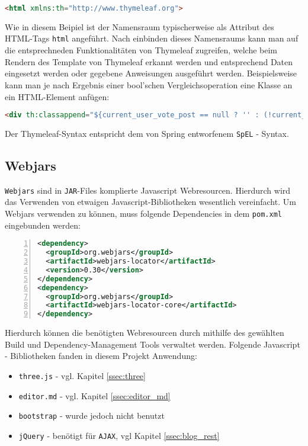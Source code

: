 \documentclass[paper=a4,12pt]{scrreprt}
\begin{document}
\begin{lstlisting}[language=html]
  <html xmlns:th="http://www.thymeleaf.org">
\end{lstlisting}

Wie in diesem Beipiel ist der Namensraum typischerweise als Attribut des HTML-Tags \texttt{html} angeführt. Nach einbinden dieses Namensraums kann man auf die entsprechneden
Funktionalitäten von Thymeleaf zugreifen, welche beim Rendern des Template von Thymeleaf erkannt werden und entsprechend Daten eingesetzt werden oder gegebene Anweisungen ausgeführt werden.\newline
Beispielsweise kann man je nach Ergebnis einer bool'schen Vergleichsoperation eine Klasse an ein HTML-Element anfügen:\newline

\begin{lstlisting}[language=html]
  <div th:classappend="${current_user_vote_post == null ? '' : (!current_user_vote_post.isUseful ? 'checked' : '')}">
\end{lstlisting}

Der Thymeleaf-Syntax entspricht dem von Spring entworfenem \texttt{SpEL} - Syntax.\newline

\subsection{Webjars}

\texttt{Webjars} sind in \texttt{JAR}-Files komplierte Javascript Webresourcen\cite{webjars}. Hierdurch wird das Verwenden von etwaigen Javascript-Bibliotheken wesentlich vereinfacht.\newline
Um Webjars verwenden zu können, muss folgende Dependencies in dem \texttt{pom.xml} eingebunden werden:\newline

\begin{lstlisting}[caption={Webjars - Maven Dependencies}, captionpos=b, label={listing:webjars_deps_maven}, language=xml, numbers=left,
  stepnumber=1]
<dependency>
  <groupId>org.webjars</groupId>
  <artifactId>webjars-locator</artifactId>
  <version>0.30</version>
</dependency>
<dependency>
  <groupId>org.webjars</groupId>
  <artifactId>webjars-locator-core</artifactId>
</dependency>
\end{lstlisting}


Hierdurch können die benötigten Webresourcen durch mithilfe des gewählten Build und Dependency-Management Tools verwaltet werden. Folgende Javascript - Bibliotheken fanden in diesem
Projekt Anwendung:\newline
\begin{itemize}
  \item \texttt{three.js} - vgl. Kapitel \ref{ssec:three}
  \item \texttt{editor.md} - vgl. Kapitel \ref{ssec:editor_md}
  \item \texttt{bootstrap} - wurde jedoch nicht benutzt
  \item \texttt{jQuery} - benötigt für \texttt{AJAX}, vgl Kapitel \ref{ssec:blog_rest}
\end{itemize}
\end{document}
